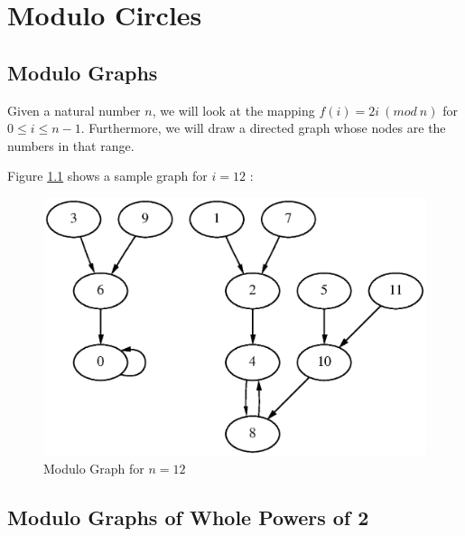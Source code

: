 \documentclass[a4paper]{report}
\begin{document}
\chapter{Modulo Circles}
\section{Modulo Graphs}

Given a natural number $ n $, we will look at the mapping 
$ f(i) = 2i ~ (mod ~ n) $ for $ 0 \leq i \leq n-1 $. Furthermore, we 
will draw a directed graph whose nodes are the numbers in that range.

Figure \ref{fig:graph-12-1} shows a sample graph for $ i = 12 $ :

\begin{figure}[ht]
\includegraphics{graph-12.eps}

\caption{\label{fig:graph-12-1} Modulo Graph for $ n = 12 $}
\end{figure}

\section{Modulo Graphs of Whole Powers of 2}
\end{document}
